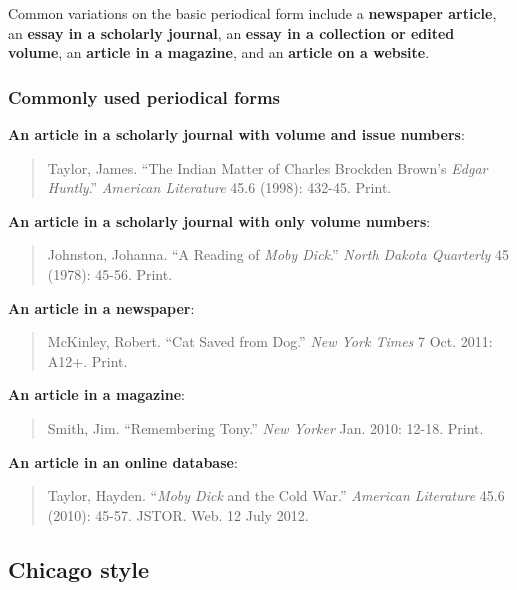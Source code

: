 \documentclass[12pt, hidelinks]{article} %
\newcommand{\tab}{\hspace*{2em}}
\begin{document}
Common variations on the basic periodical form include a \textbf{newspaper article}, an \textbf{essay in a scholarly journal}, an \textbf{essay in a collection or edited volume}, an \textbf{article in a magazine}, and an \textbf{article on a website}.

\subsubsection{Commonly used periodical forms}

\textbf{An article in a scholarly journal with volume and issue numbers}:
\begin{quote}
Taylor, James. ``The Indian Matter of Charles Brockden Brown's \emph{Edgar \tab Huntly}.'' \emph{American Literature} 45.6 (1998): 432-45. Print.
\end{quote}


\textbf{An article in a scholarly journal with only volume numbers}:
\begin{quote}
Johnston, Johanna. ``A Reading of \emph{Moby Dick}.'' \emph{North Dakota Quarterly} \tab 45 (1978): 45-56. Print.
\end{quote}

\textbf{An article in a newspaper}:
\begin{quote}
McKinley, Robert. ``Cat Saved from Dog.'' \emph{New York Times} 7 Oct. 2011: \tab A12+. Print.
\end{quote}

\textbf{An article in a magazine}:
\begin{quote}
Smith, Jim. ``Remembering Tony.'' \emph{New Yorker} Jan. 2010: 12-18. Print.
\end{quote}

\textbf{An article in an online database}:
\begin{quote}
Taylor, Hayden. ``\emph{Moby Dick} and the Cold War.'' \emph{American Literature} \tab 45.6 (2010): 45-57. 
JSTOR. Web. 12 July 2012.
\end{quote}



\subsection{Chicago style}
\end{document}
